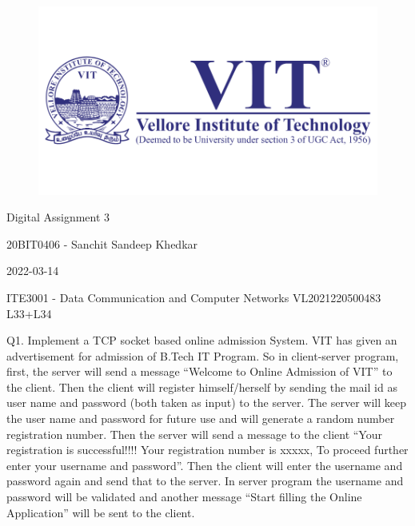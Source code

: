 \documentclass[12pt]{article}
\begin{document}
\begin{titlepage}
\NoBgThispage
   \begin{center}
        \begin{figure}[h] %
        \centering
        \includegraphics[width=15cm]{1583124354phpJTtnK5.png}
        \end{figure}

        \Huge{Digital Assignment 3}

        \vspace{0.5cm}
        \LARGE{20BIT0406 - Sanchit Sandeep Khedkar}
       
        \vspace{2.5 cm}
        \Large{2022-03-14}
        
        \vspace{0.25 cm}
        \Large{ITE3001 - Data Communication and Computer Networks}
        \large{VL2021220500483 L33+L34}
       

       \vfill
    \end{center}
\end{titlepage}
\newpage

\setcounter{page}{2}
\pagestyle{fancy}
\fancyhf{}
\rhead{\thepage}

Q1.  
Implement a TCP socket based online admission System. VIT has given an advertisement for admission of B.Tech IT Program. So in client-server program, first, the server will send a message “Welcome to Online Admission of VIT” to the client. Then the client will register himself/herself by sending the mail id as user name and password (both taken as input) to the server. The server will keep the user name and password for future use and will generate a random number registration number. Then the server will send a message to the client “Your registration is successful!!!! Your registration number is xxxxx, To proceed further enter your username and password”. Then the client will enter the username and password again and send that to the server. In server program the username and password will be validated and another message “Start filling the Online Application” will be sent to the client.
\end{document}
